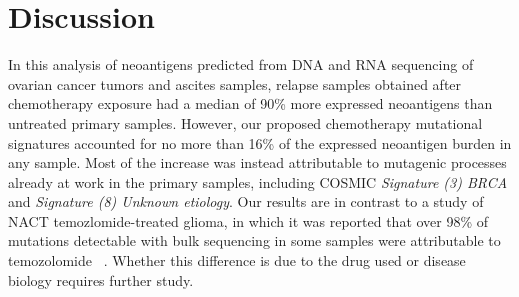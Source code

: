 \section*{Discussion}
In this analysis of neoantigens predicted from DNA and RNA sequencing of ovarian cancer tumors and ascites samples, relapse samples obtained after chemotherapy exposure had a median of 90\% more expressed neoantigens than untreated primary samples. However, our proposed chemotherapy mutational signatures accounted for no more than 16\% of the expressed neoantigen burden in any sample. Most of the increase was instead attributable to mutagenic processes already at work in the primary samples, including COSMIC \textit{Signature (3) BRCA} and \textit{Signature (8) Unknown etiology}. Our results are in contrast to a study of NACT temozlomide-treated glioma, in which it was reported that over 98\% of mutations detectable with bulk sequencing in some samples were attributable to temozolomide ~\cite{Johnson_2013}. Whether this difference is due to the drug used or disease biology requires further study.


